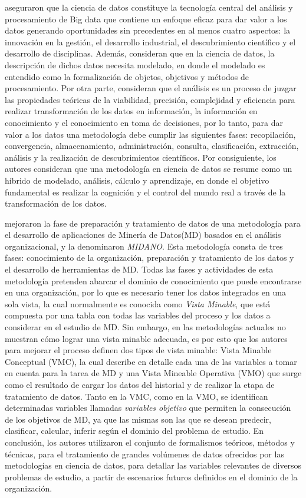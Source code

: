 \cite{Xu2021} aseguraron que la ciencia de datos constituye la tecnología central del análisis y procesamiento de Big data que contiene un enfoque eficaz para dar valor a los datos generando oportunidades sin precedentes en al menos cuatro aspectos: la innovación en la gestión, el desarrollo industrial, el descubrimiento científico y el desarrollo de disciplinas. Además, consideran que en la ciencia de datos, la descripción de dichos datos necesita modelado, en donde el modelado es entendido como la formalización de objetos, objetivos y métodos de procesamiento. Por otra parte, consideran que el análisis es un proceso de juzgar las propiedades teóricas de la viabilidad, precisión, complejidad y eficiencia para realizar transformación de los datos en información, la información en conocimiento y  el conocimiento en toma de decisiones, por lo tanto, para dar valor a los datos una metodología debe cumplir las siguientes fases: recopilación, convergencia, almacenamiento, administración, consulta, clasificación, extracción, análisis  y la realización de descubrimientos científicos. Por consiguiente, los autores consideran que una metodología en ciencia de datos se resume como un híbrido de modelado, análisis, cálculo y aprendizaje, en donde el objetivo fundamental es realizar la cognición y el control del mundo real a través de la transformación de los datos.

\cite{Pacheco2014} mejoraron la fase de preparación y tratamiento de datos de una metodología para el desarrollo de aplicaciones de Minería de Datos(MD) basados en el análisis organizacional, y la denominaron \textit{MIDANO}. Esta metodología consta de tres fases: conocimiento de la organización,  preparación y tratamiento de los datos y el desarrollo de herramientas de MD. Todas las fases y actividades de esta metodología pretenden abarcar el dominio de conocimiento que puede encontrarse en una organización, por lo que es necesario tener los datos integrados en una sola vista, la cual normalmente es conocida como \textit{Vista Minable}, que está compuesta por una tabla con todas las variables del proceso y los datos a considerar en el estudio de MD. Sin embargo, en las metodologías actuales no muestran cómo lograr una vista minable adecuada, es por esto que los autores para mejorar el proceso definen dos tipos de vista minable: Vista Minable Conceptual (VMC), la cual describe en detalle cada una de las variables a tomar en cuenta para la tarea de MD  y una Vista Mineable Operativa (VMO) que surge como el resultado de cargar los datos del historial y de realizar la etapa de tratamiento de datos. Tanto en la VMC, como en la VMO, se identifican determinadas variables llamadas \textit{variables objetivo} que permiten la consecución de los objetivos de MD, ya que las mismas son las que se desean predecir, clasificar, calcular, inferir según el dominio del problema de estudio. En conclusión, los autores utilizaron el conjunto de formalismos teóricos, métodos y técnicas, para el tratamiento de grandes volúmenes de datos ofrecidos por las metodologías en ciencia de datos, para detallar las variables relevantes de diversos problemas de estudio, a partir de escenarios futuros definidos en el dominio de la organización.

